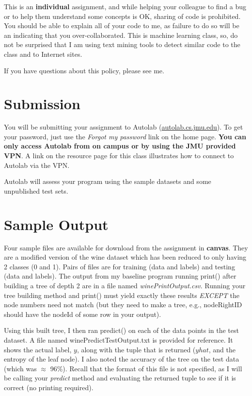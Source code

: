 \documentclass[11pt,letterpaper]{article}
\newcounter{points}
\newcounter{question}
\begin{document}
This is an {\bf individual} assignment, and while helping your colleague to find a bug or to help them
understand some concepts is OK, sharing of code is prohibited.  You should be able to explain all of your
code to me, as failure to do so will be an indicating that you over-collaborated.  This is machine learning
class, so, do not be surprised that I am using text mining tools to detect similar code to the class
and to Internet sites.  
\\
\vspace{0.25cm}

If you have questions about this policy, please see me.

\section*{Submission}
You will be submitting your assignment to Autolab (\url{autolab.cs.jmu.edu}).  To get your password,
just use the \emph{Forgot my password} link on the home page.  {\bf You can only access Autolab
from on campus or by using the JMU provided VPN}.  A link on the resource page for this
class illustrates how to connect to Autolab via the VPN.  

\vspace{0.25cm}
Autolab will assess your program using the sample datasets and some
unpublished test sets.

\section*{Sample Output}
Four sample files are available for download from the assignment in {\bf canvas}. 
They are a modified version
of the wine dataset which has been reduced to only having 2 classes (0 and 1).  Pairs of files are 
for training (data and labels) and testing (data and labels).  The output from my baseline program
running print() after building a tree of depth 2 are in a file named \emph{winePrintOutput.csv}.  Running
your tree building method and print() must yield exactly these results \emph{EXCEPT} the node numbers
need not match (but they need to make a tree, e.g., nodeRightID should have the nodeId of some row
in your output).  

\vspace{0.25 cm}

Using this built tree, I then ran predict() on each of the data points in the test dataset.  A file named 
winePredictTestOutput.txt is provided for reference.  It shows the actual label, $y$, along with the tuple
that is returned ($yhat$, and the entropy of the leaf node).  I also noted the accuracy of the 
tree on the test data (which was $\approx$ 96\%).  Recall that the format of this file is 
not specified, as I will be calling your \emph{predict} method and evaluating the returned
tuple to see if it is correct (no printing required).
\end{document}
